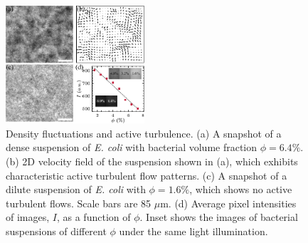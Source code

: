 \documentclass[twocolumn,aps,prx,amsmath,amssymb,longbibliography]{revtex4-2}
\begin{document}
\begin{figure}[t]
	\begin{center}
		\includegraphics[width=0.46\textwidth]{Figures/fig-1.pdf}
		\caption[Experimental details]
		{Density fluctuations and active turbulence.
			(a) A snapshot of a dense suspension of \textit{E. coli} with bacterial volume fraction $\phi = 6.4\%$.
			(b) 2D velocity field of the suspension shown in (a), which exhibits characteristic active turbulent flow patterns.
			(c) A snapshot of a dilute suspension of \textit{E. coli} with $\phi = 1.6\%$, which shows no active turbulent flows. Scale bars are 85 $\mu$m.
			(d) Average pixel intensities of images, $I$, as a function of $\phi$. Inset shows the images of bacterial suspensions of different $\phi$ under the same light illumination.
		}
		\label{fig:experiment}
	\end{center}
\end{figure}
\end{document}
